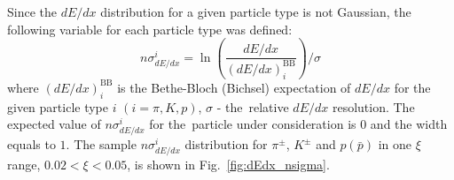 \noindent Since the $dE/dx$ distribution for a given particle type
is not Gaussian, the following variable for each particle type was defined:
\begin{equation}
n\sigma^i_{dE/dx}=\ln\left(\frac{dE/dx}{(dE/dx)_i^\textrm{{BB}}}\right)/\sigma
\label{eq:nsigma}
\end{equation}
where $(dE/dx)_i^\textrm{{BB}}$ is the Bethe-Bloch (Bichsel) expectation
of $dE/dx$ for the given particle type $i$ $(i =
\pi, K, p)$, $\sigma$ - the~relative $dE/dx$ resolution.
The expected value of $n\sigma^i_{dE/dx}$ for the~particle under consideration is  $0$  and the width equals to $1$. The sample $n\sigma^i_{dE/dx}$ distribution for $\pi^{\pm}$, $K^\pm$ and $p(\bar{p})$ in one $\xi$ range, $0.02 < \xi < 0.05$, is shown  in Fig.~\ref{fig:dEdx_nsigma}.
\begin{figure}[h!]
	

\end{figure}
